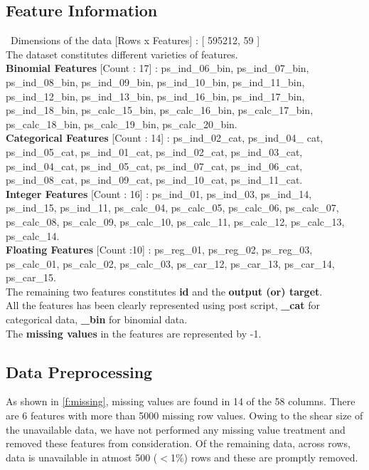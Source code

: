 \subsection{Feature Information}
\ Dimensions of the data [Rows x Features] : [ 595212, 59 ]
\\ \newline The dataset constitutes different varieties of features.
\\ \newline \textbf{Binomial Features} [Count : 17] :  ps\_ind\_06\_bin,  ps\_ind\_07\_bin, ps\_ind\_08\_bin, ps\_ind\_09\_bin, ps\_ind\_10\_bin, ps\_ind\_11\_bin, ps\_ind\_12\_bin, ps\_ind\_13\_bin, ps\_ind\_16\_bin, ps\_ind\_17\_bin, ps\_ind\_18\_bin, ps\_calc\_15\_bin, ps\_calc\_16\_bin, ps\_calc\_17\_bin, ps\_calc\_18\_bin, ps\_calc\_19\_bin, ps\_calc\_20\_bin.
\
\\ \newline \textbf{Categorical Features} [Count : 14] : ps\_ind\_02\_cat,  ps\_ind\_04\_ cat, ps\_ind\_05\_cat, ps\_ind\_01\_cat, ps\_ind\_02\_cat,  ps\_ind\_03\_cat, ps\_ind\_04\_cat, ps\_ind\_05\_cat, ps\_ind\_07\_cat,  ps\_ind\_06\_cat, ps\_ind\_08\_cat, ps\_ind\_09\_cat, ps\_ind\_10\_cat,  ps\_ind\_11\_cat.
\
\\ \newline \textbf{Integer Features} [Count : 16] : ps\_ind\_01, ps\_ind\_03, ps\_ind\_14, ps\_ind\_15, ps\_ind\_11, ps\_calc\_04, ps\_calc\_05, ps\_calc\_06, ps\_calc\_07, ps\_calc\_08, ps\_calc\_09, ps\_calc\_10, ps\_calc\_11, ps\_calc\_12, ps\_calc\_13, ps\_calc\_14.
\
\\ \newline \textbf{Floating Features} [Count :10] : ps\_reg\_01, ps\_reg\_02, ps\_reg\_03, ps\_calc\_01, ps\_calc\_02, ps\_calc\_03, ps\_car\_12, ps\_car\_13, ps\_car\_14, ps\_car\_15.
\\ \newline  The remaining two features constitutes \textbf{id} and the \textbf{output (or) target}. 
\\ \newline All the features has been clearly represented using post script, \textbf{\_cat} for categorical data, \textbf{\_bin} for binomial data.
\\ \newline The \textbf{missing values} in the features are represented by -1.

\subsection{Data Preprocessing}
As shown in \ref{f:missing}, missing values are found in 14 of the 58 columns. There are 6 features with more than 5000 missing row values. Owing to the shear size of the unavailable data, we have not performed any missing value treatment and removed these features from consideration. Of the remaining data, across rows, data is unavailable in atmost 500 ($<$1\%) rows and these are promptly removed.

